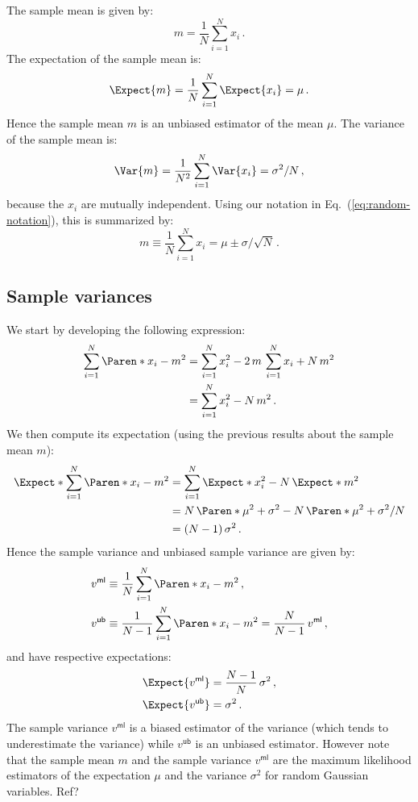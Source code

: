 \documentclass[a4paper,11pt,twoside]{scrartcl}
\newcommand{\oops}[1]{\textcolor[named]{BrickRed}{#1}}
\newcommand*{\Tag}[1]{\mathsf{#1}}
\theoremstyle{plain} %
\theoremstyle{definition}
\theoremstyle{remark}
\begin{document}
The sample mean is given by:
\begin{equation}
  m = \frac{1}{N} \sum_{i=1}^N x_i \, .
\end{equation}
The expectation of the sample mean is:
\begin{equation}
  \Expect{m} = \frac{1}{N} \sum_{i=1}^N \Expect{x_i} = \mu \,.
\end{equation}
Hence the sample mean $m$ is an unbiased estimator of the mean $\mu$.  The
variance of the sample mean is:
\begin{equation}
  \Var{m} = \frac{1}{N^2} \sum_{i=1}^N \Var{x_i} = \sigma^2/N \,,
\end{equation}
because the $x_i$ are mutually independent.  Using our notation in
Eq.~(\ref{eq:random-notation}), this is summarized by:
\begin{equation}
  \boxed{
     m \equiv \frac{1}{N} \sum_{i=1}^N x_i = \mu \pm \sigma/\sqrt{N}
  } \, .
  \label{eq:sample-mean-summary}
\end{equation}


\subsection{Sample variances}
\label{sec:sample-variances}

We start by developing the following expression:
\begin{align}
  \sum_{i=1}^N \Paren*{x_i - m}^2
  &= \sum_{i=1}^N x_i^2 - 2\,m\,\sum_{i=1}^N x_i + N\,m^2 \notag \\
  &= \sum_{i=1}^N x_i^2 - N\,m^2 \, .
\end{align}
We then compute its expectation (using the previous results about the
sample mean $m$):
\begin{align}
  \Expect*{\sum_{i=1}^N \Paren*{x_i - m}^2}
  &= \sum_{i=1}^N \Expect*{x_i^2} - N\,\Expect*{m^2} \notag\\
  &= N\,\Paren*{\mu^2 + \sigma^2} - N\,\Paren*{\mu^2 + \sigma^2/N} \notag\\
  &= (N - 1)\,\sigma^2 \, .
\end{align}
Hence the sample variance and unbiased sample variance are given by:
\begin{align}
  v^\Tag{ml} &\equiv \frac{1}{N} \sum_{i=1}^N \Paren*{x_i - m}^2 \, , \\
  v^\Tag{ub} &\equiv \frac{1}{N - 1} \sum_{i=1}^N \Paren*{x_i - m}^2
  = \frac{N}{N - 1} \, v^\Tag{ml} \, ,
\end{align}
and have respective expectations:
\begin{align}
 \Expect{v^\Tag{ml}} &= \frac{N - 1}{N} \, \sigma^2 \, , \\
 \Expect{v^\Tag{ub}} &= \sigma^2 \, .
\end{align}
The sample variance $v^\Tag{ml}$ is a biased estimator of the variance (which tends to
underestimate the variance) while $v^\Tag{ub}$ is an unbiased estimator. However note
that the sample mean $m$ and the sample variance $v^\Tag{ml}$ are the maximum likelihood
estimators of the expectation $\mu$ and the variance $\sigma^2$ for random
Gaussian variables. \oops{Ref?}
\end{document}
